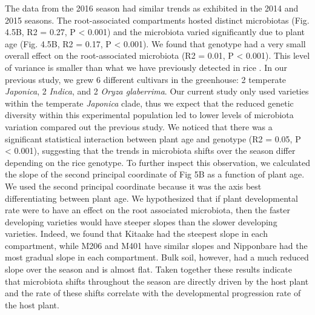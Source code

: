 The data from the 2016 season had similar trends as exhibited in the 2014 and 2015 seasons. The root-associated compartments hosted distinct microbiotas (Fig. 4.5B, R2 = 0.27, P < 0.001) and the microbiota varied significantly due to plant age (Fig. 4.5B, R2 = 0.17, P < 0.001). We found that genotype had a very small overall effect on the root-associated microbiota (R2 = 0.01, P < 0.001). This level of variance is smaller than what we have previously detected in rice \cite{Edwards2015}. In our previous study, we grew 6 different cultivars in the greenhouse: 2 temperate \textit{Japonica}, 2 \textit{Indica}, and 2 \textit{Oryza glaberrima}. Our current study only used varieties within the temperate \textit{Japonica} clade, thus we expect that the reduced genetic diversity within this experimental population led to lower levels of microbiota variation compared out the previous study. We noticed that there was a significant statistical interaction between plant age and genotype (R2 = 0.05, P < 0.001), suggesting that the trends in microbiota shifts over the season differ depending on the rice genotype. To further inspect this observation, we calculated the slope of the second principal coordinate of Fig 5B as a function of plant age. We used the second principal coordinate because it was the axis best differentiating between plant age. We hypothesized that if plant developmental rate were to have an effect on the root associated microbiota, then the faster developing varieties would have steeper slopes than the slower developing varieties. Indeed, we found that Kitaake had the steepest slope in each compartment, while M206 and M401 have similar slopes and Nipponbare had the most gradual slope in each compartment. Bulk soil, however, had a much reduced slope over the season and is almost flat. Taken together these results indicate that microbiota shifts throughout the season are directly driven by the host plant and the rate of these shifts correlate with the developmental progression rate of the host plant.

